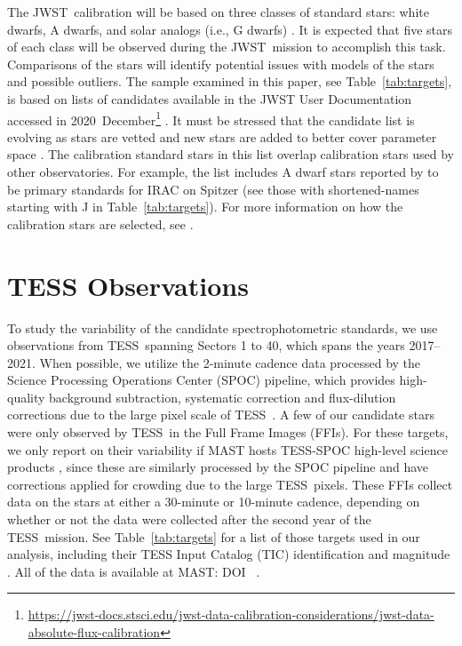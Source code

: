 \documentclass[twocolumn]{aastex631}
\newcommand{\webb}{JWST}
\newcommand{\jwst}{JWST}
\newcommand{\tess}{TESS}
\begin{document}
The \webb\ calibration will be based on three classes of standard stars:  white dwarfs, A dwarfs, and solar analogs (i.e., G dwarfs) \citep{Gordon2022inprep}.  It is expected that five stars of each class will be observed during the \jwst\ mission to accomplish this task.  Comparisons of the stars will identify potential issues with models of the stars and possible outliers.  The sample examined in this paper, see Table~\ref{tab:targets}, is based on lists of candidates available in the JWST User Documentation accessed in 2020~December\footnote{\url{https://jwst-docs.stsci.edu/jwst-data-calibration-considerations/jwst-data-absolute-flux-calibration}} \citep{jdox}.  It must be stressed that the candidate list is evolving as stars are vetted and new stars are added to better cover parameter space \citep{Gordon2022inprep}.  The calibration standard stars in this list overlap calibration stars used by other observatories. For example, the list includes A dwarf stars reported by \citet{Reach2005} to be primary standards for IRAC on Spitzer (see those with shortened-names starting with J in Table~\ref{tab:targets}). For more information on how the calibration stars are selected, see \citet{Gordon2022inprep}.



\section{TESS Observations}
\label{sec:obs}

To study the variability of the candidate spectrophotometric standards, we use observations from \tess\ spanning Sectors 1 to 40, which spans the years 2017--2021. When possible, we utilize the 2-minute cadence data processed by the Science Processing Operations Center (SPOC) pipeline, which provides high-quality background subtraction, systematic correction and flux-dilution corrections due to the large pixel scale of \tess\ \citep{kdph2020ksciApertures,kdph2020ksciCal,kdph2020ksciPA,kdph2020PDC}. A few of our candidate stars were only observed by \tess\ in the Full Frame Images (FFIs). For these targets, we only report on their variability if MAST hosts \tess-SPOC high-level science products \citep{Caldwell2020spoc}, since these are similarly processed by the SPOC pipeline and have corrections applied for crowding due to the large \tess\ pixels. These FFIs collect data on the stars at either a 30-minute or 10-minute cadence, depending on whether or not the data were collected after the second year of the \tess\ mission. See Table~\ref{tab:targets} for a list of those targets used in our analysis, including their TESS Input Catalog (TIC) identification and magnitude \citep{Stassun2018TIC}. All of the data is available at MAST: DOI~ .
\end{document}
